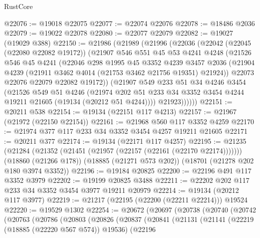 \begin{lexlean}{RustCore}
\begin{coremodule}
@22076 := @19018 @22075
@22077 := @22074 @22076
@22078 := @18486 @2036
@22079 := @19022 @22078
@22080 := @22077 @22079
@22082 := @19027 (@19029 @388)
@22150 := @21986
    (@21989
      (@21996
        (@22036
          (@22042
            (@22045 (@22080 @22082 @19172))
            (@21907
              @546
              @551
              @45
              @53
              @4241
              @4248
              (@21526
                @546
                @45
                @4241
                (@22046
                  @298
                  @1995
                  @45
                  @3352
                  @4239
                  @3457
                  @2036
                  (@21904 @4239 (@21911 @3462 @4014 (@21753 @3462 @21756 @19351) @21924))
                  @22073
                  @22076
                  @22079
                  @22082
                  @19172))
              (@21907
                @549
                @233
                @51
                @34
                @4246
                @3454
                (@21526
                  @549
                  @51
                  @4246
                  (@21974
                    @202
                    @51
                    @233
                    @34
                    @3352
                    @3454
                    @4244
                    @19211
                    @21605
                    (@19134 (@20212 @51 @4244))))
                @21923))))))
@22151 := @20211 @538
@22154 := @19134 (@22151 @117 @4213)
@22157 := @21967 (@21972 (@22150 @22154))
@22161 := @21968 @560 @117 @3352 @4259
@22170 := @21974 @377 @117 @233 @34 @3352 @3454 @4257 @19211 @21605
@22171 := @20211 @377
@22174 := @19134 (@22171 @117 @4257)
@22195 := @21235
    (@21284 (@21352 (@21451 (@21957 (@22157 (@22161 (@22170 @22174)))))))
    (@18860 (@21266 @178))
    (@18885 (@21271 @573 @202))
    (@18701 (@21278 @202 @180 @3974 @3352))
@22196 := @19184 @20825
@22200 := @22196 @491 @117 @3352 @3979
@22202 := @19199 @20825 @3488
@22211 := @22202 @202 @117 @233 @34 @3352 @3454 @3977 @19211 @20979
@22214 := @19134 (@20212 @117 @3977)
@22219 := @21217 (@22195 (@22200 (@22211 @22214))) @19524
@22220 := @19529 @1302
@22254 := @20672
    (@20697
      (@20738
        (@20740
          (@20742
            (@20763
              (@20786
                (@20803
                  (@20826
                    (@20837
                      (@20841
                        (@21131
                          (@21141
                            (@22219 (@18885 (@22220 @567 @574)) @19536)
                            (@22196

\end{coremodule}
\end{lexlean}
